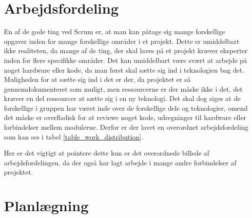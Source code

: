 \documentclass[a4paper,12pt,fleqn,oneside]{article}
\begin{document}
\section{Arbejdsfordeling}
En af de gode ting ved Scrum er, at man kan påtage sig mange forskellige opgaver inden for mange forskellige områder i et projekt. Dette er umiddelbart ikke realiteten, da mange af de ting, der skal laves på et projekt kræver eksperter inden for flere specifikke områder. Det kan umiddelbart være svært at arbejde på noget hardware eller kode, da man først skal sætte sig ind i teknologien bag det. Muligheden for at sætte sig ind i det er der, da projektet er så gennemdokumenteret som muligt, men ressourcerne er der måske ikke i det, det kræver en del ressourcer at sætte sig i en ny teknologi. Det skal dog siges at de forskellige i gruppen har været inde over de forskellige dele og teknologier, omend det måske er overfladisk for at reviewe noget kode, udregninger til hardware eller forbindelser mellem modulerne. Derfor er der lavet en overordnet arbejdsfordeling som kan ses i tabel \ref{table_work_distribution}.
\begin{table}[H]
\centering
{}
\caption{Overordnet arbejdsfordeling i gruppen}
\label{table_work_distribution}
\end{table}
Her er det vigtigt at pointere dette kun er det overordnede billede af arbejdsfordelingen, da der også har lagt arbejde i mange andre forbindelser af projektet.

\section{Planlægning}
\end{document}
